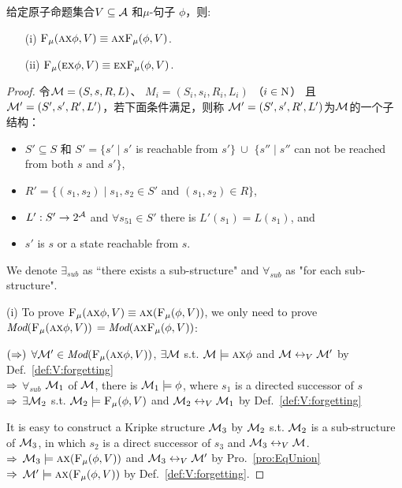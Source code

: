\begin{proposition}[同质性]\label{chapter06:pro:mu:forget:2}
	给定原子命题集合$V\subseteq\cal A$ 和$\mu$-句子 $\phi$，则: %
	\begin{itemize}
		\item[(i)] ${\textsc{F}_{\textsc{$\mu$}}}(\textsc{a}\textsc{x}\phi,V)\equiv \textsc{a}\textsc{x} {\textsc{F}_{\textsc{$\mu$}}}(\phi,V)$.
		\item[(ii)] ${\textsc{F}_{\textsc{$\mu$}}}(\textsc{e}\textsc{x}\phi,V)\equiv\textsc{e}\textsc{x} {\textsc{F}_{\textsc{$\mu$}}}(\phi,V)$.
	\end{itemize}
\end{proposition}
\begin{proof}
	令${\cal M}=(S, s,R, L)$、 $M_i = (S_i, s_i, R_i, L_i)$ （$i \in \textmd{N}$） 且 ${\cal M}'=(S', s', R', L')$，若下面条件满足，则称 ${\cal M}'=(S', s', R', L')$为${\cal M}$的一个子结构：
	\begin{itemize}
		\item $S' \subseteq S$ 和 $S'=\{s' \mid s'$ is reachable from $s'\}\ \cup $ $\{s'' \mid s''$ can not be reached from both $s$ and $s'$$\}$,
		\item $R' =\{(s_1, s_2)\mid s_1, s_2 \in S'$ and $(s_1, s_2) \in R\}$,
		\item $L': S' \rightarrow 2^{\cal A}$ and $\forall s_51 \in S'$ there is $L'(s_1) = L(s_1)$, and
		\item $s'$ is $s$ or a state reachable from $s$.
	\end{itemize}
	
	We denote $\exists_{sub}$ as ``there exists a sub-structure" and $\forall_{sub}$ as "for each sub-structure".
	
	(i) To prove ${\textsc{F}_{\textsc{$\mu$}}}(\textsc{a} \textsc{x} \phi, V) \equiv \textsc{a} \textsc{x}({\textsc{F}_{\textsc{$\mu$}}}(\phi, V))$, we only need to prove $\textit{Mod}({\textsc{F}_{\textsc{$\mu$}}}(\textsc{a} \textsc{x} \phi, V))$ $= \textit{Mod}( \textsc{a}\textsc{x}{\textsc{F}_{\textsc{$\mu$}}}(\phi, V))$:
	
	$(\Rightarrow)$ $\forall {\cal M}' \in \textit{Mod}({\textsc{F}_{\textsc{$\mu$}}}(\textsc{a} \textsc{x} \phi, V))$, $\exists {\cal M}$ s.t. ${\cal M} \models \textsc{a} \textsc{x} \phi$ and ${\cal M} \leftrightarrow_V {\cal M}'$  by Def.~\ref{def:V:forgetting}\\
	$\Rightarrow$ $\forall_{sub}$ ${\cal M}_1$ of ${\cal M}$,  there is ${\cal M}_1 \models \phi$, where $s_1$ is a directed successor of $s$ \\
	$\Rightarrow$ $\exists {\cal M}_2$ s.t. ${\cal M}_2 \models {\textsc{F}_{\textsc{$\mu$}}}(\phi,V)$ and ${\cal M}_2 \leftrightarrow_V {\cal M}_1$ by Def.~\ref{def:V:forgetting}
	
	It is easy to construct a Kripke structure ${\cal M}_3$ by ${\cal M}_2$ s.t. ${\cal M}_2$ is a sub-structure of ${\cal M}_3$, in which $s_2$ is a direct successor of $s_3$ and ${\cal M}_3 \leftrightarrow_V {\cal M}$.\\
	$\Rightarrow$ ${\cal M}_3 \models \textsc{a} \textsc{x} ({\textsc{F}_{\textsc{$\mu$}}}(\phi,V))$ and ${\cal M}_3 \leftrightarrow_V {\cal M}'$ by Pro.~\ref{pro:EqUnion}\\
	$\Rightarrow$ ${\cal M}' \models \textsc{a} \textsc{x} ({\textsc{F}_{\textsc{$\mu$}}}(\phi,V))$  by Def.~\ref{def:V:forgetting}.
	

\end{proof}
